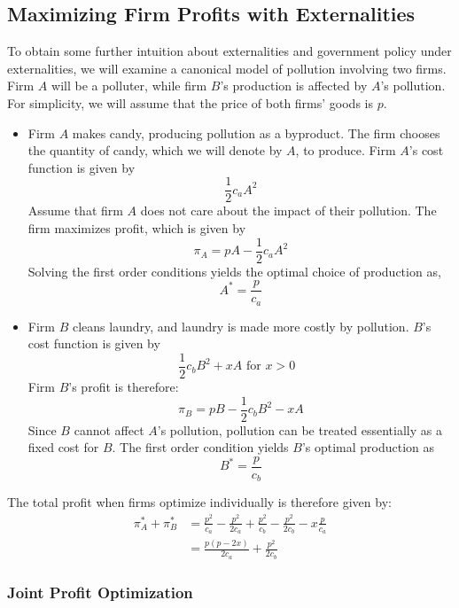 \subsection*{Maximizing Firm Profits with Externalities}
To obtain some further intuition about externalities and government policy under externalities, we will examine a canonical model of pollution involving two firms. Firm $A$ will be a polluter, while firm $B$'s production is affected by $A$'s pollution. For simplicity, we will assume that the price of both firms' goods is $p$. 
\begin{itemize}
    \item Firm $A$ makes candy, producing pollution as a byproduct. The firm chooses the quantity of candy, which we will denote by $A$, to produce. Firm $A$'s cost function is given by
    \begin{equation*}
        \frac{1}{2} c_a A^2
    \end{equation*}
    Assume that firm $A$ does not care about the impact of their pollution. The firm maximizes profit, which is given by
    \begin{equation*}
        \pi_A = pA - \frac{1}{2} c_a A^2
    \end{equation*}
    Solving the first order conditions yields the optimal choice of production as, 
    \begin{equation*}
        A^* = \frac{p}{c_a}
    \end{equation*}

    \item Firm $B$ cleans laundry, and laundry is made more costly by pollution. $B$'s cost function is given by
    \begin{equation*}
        \frac{1}{2} c_b B^2 + x A \text{ for $x > 0$ }
    \end{equation*}
    Firm $B$'s profit is therefore:
    \begin{equation*}
        \pi_B = pB - \frac{1}{2}c_b B^2 - x A
    \end{equation*}
    Since $B$ cannot affect $A$'s pollution, pollution can be treated essentially as a fixed cost for $B$. The first order condition yields $B$'s optimal production as
    \begin{equation*}
        B^* = \frac{p}{c_b} 
    \end{equation*}
\end{itemize}
The total profit when firms optimize individually is therefore given by:
\begin{equation*}
    \begin{split}
        \pi_A^* + \pi_B^* &= \frac{p^2}{c_a} - \frac{p^2}{2 c_a} + \frac{p^2}{c_b}  - \frac{p^2}{2 c_b} - x \frac{p}{c_a} \\ 
        &= \frac{p (p - 2x) }{2 c_a} + \frac{p^2}{2 c_b}
    \end{split}
\end{equation*}

\subsubsection*{Joint Profit Optimization}
